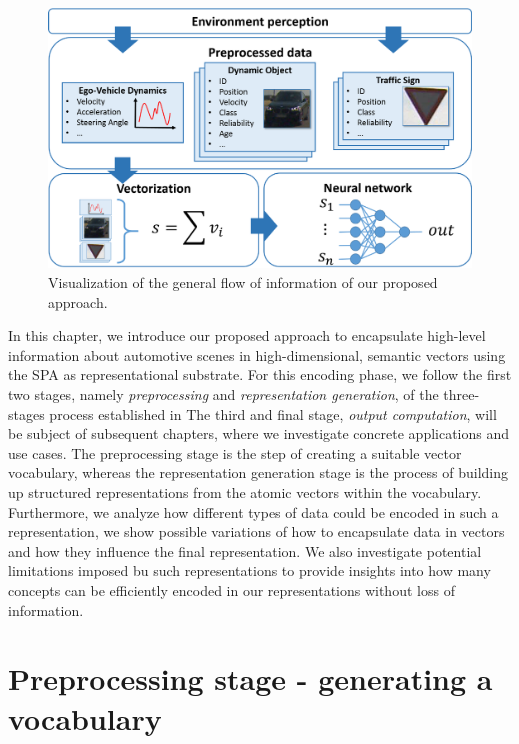\begin{figure}[t]
    \centering
    \includegraphics[width=0.8\linewidth]{imgs/system_overview_horizontal.eps}
    \caption{Visualization of the general flow of information of our proposed approach.}
    \label{fig:vectorization}
\end{figure}

In this chapter, we introduce our proposed approach to encapsulate high-level information about automotive scenes in high-dimensional, semantic vectors using the \ac{SPA} as representational substrate.
For this encoding phase, we follow the first two stages, namely \emph{preprocessing} and \emph{representation generation}, of the three-stages process established in \textcite{Gallant2013} 
The third and final stage, \emph{output computation}, will be subject of subsequent chapters, where we investigate concrete applications and use cases.
The preprocessing stage is the step of creating a suitable vector vocabulary, whereas the representation generation stage is the process of building up structured representations from the atomic vectors within the vocabulary.
Furthermore, we analyze how different types of data could be encoded in such a representation, we show possible variations of how to encapsulate data in vectors and how they influence the final representation.
We also investigate potential limitations imposed bu such representations to provide insights into how many concepts can be efficiently encoded in our representations without loss of information.  


\section{Preprocessing stage - generating a vocabulary}%
\label{sec:preprocessing_stage_generating_a_vocabulary}

